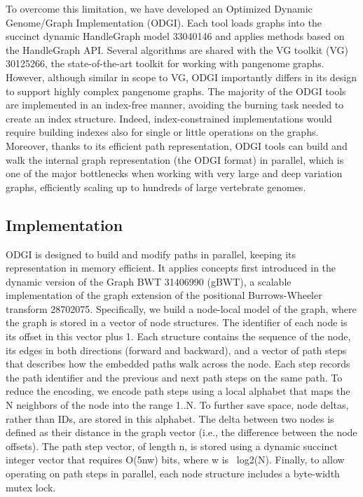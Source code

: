 \documentclass{bioinfo}
\begin{document}
To overcome this limitation, we have developed an Optimized Dynamic Genome/Graph Implementation (ODGI). Each tool loads graphs into the succinct dynamic HandleGraph model {33040146} and applies methods based on the HandleGraph API. Several algorithms are shared with the VG toolkit (VG) {30125266}, the state-of-the-art toolkit for working with pangenome graphs. However, although similar in scope to VG, ODGI importantly differs in its design to support highly complex pangenome graphs. The majority of the ODGI tools are implemented in an index-free manner, avoiding the burning task needed to create an index structure. Indeed, index-constrained implementations would require building indexes also for single or little operations on the graphs. Moreover, thanks to its efficient path representation, ODGI tools can build and walk the internal graph representation (the ODGI format) in parallel, which is one of the major bottlenecks when working with very large and deep variation graphs, efficiently scaling up to hundreds of large vertebrate genomes.

\cite{Eizenga_2020}

\begin{methods}

\section{Implementation}

ODGI is designed to build and modify paths in parallel, keeping its representation in memory efficient. It applies concepts first introduced in the dynamic version of the Graph BWT {31406990} (gBWT), a scalable implementation of the graph extension of the positional Burrows-Wheeler transform {28702075}. Specifically, we build a node-local model of the graph, where the graph is stored in a vector of node structures. The identifier of each node is its offset in this vector plus 1. Each structure contains the sequence of the node, its edges in both directions (forward and backward), and a vector of path steps that describes how the embedded paths walk across the node. Each step records the path identifier and the previous and next path steps on the same path. To reduce the encoding, we encode path steps using a local alphabet that maps the N neighbors of the node into the range 1..N. To further save space, node deltas, rather than IDs, are stored in this alphabet. The delta between two nodes is defined as their distance in the graph vector (i.e., the difference between the node offsets). The path step vector, of length n, is stored using a dynamic succinct integer vector that requires O(5nw) bits, where w is ~log2(N). Finally, to allow operating on path steps in parallel, each node structure includes a byte-width mutex lock.

\end{methods}
\end{document}
